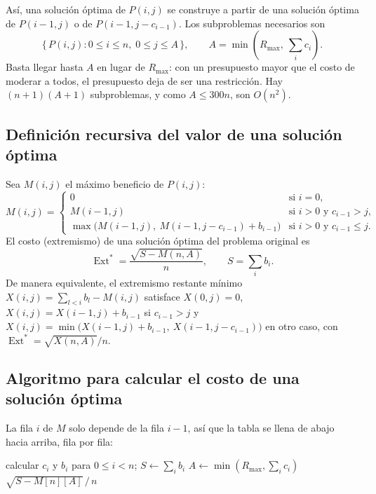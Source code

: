 \documentclass[11pt,letterpaper]{article}
\newcommand{\Ext}{\operatorname{Ext}}
\newcommand{\Rmax}{R_{\max}}
\begin{document}
Así, una solución óptima de $P(i,j)$ se construye a partir de una solución
óptima de $P(i-1,j)$ o de $P(i-1,j-c_{i-1})$. Los subproblemas necesarios son
\[
  \{\, P(i,j) : 0 \le i \le n,\; 0 \le j \le A \,\},
  \qquad A = \min\!\left(\Rmax,\ \sum_i c_i\right).
\]
Basta llegar hasta $A$ en lugar de $\Rmax$: con un presupuesto mayor que el
costo de moderar a todos, el presupuesto deja de ser una restricción. Hay
$(n+1)(A+1)$ subproblemas, y como $A \le 300n$, son $O(n^2)$.

\subsection{Definición recursiva del valor de una solución óptima}

Sea $M(i,j)$ el máximo beneficio de $P(i,j)$:
\[
  M(i,j) =
  \begin{cases}
    0 & \text{si } i = 0,\\[2pt]
    M(i-1, j) & \text{si } i > 0 \text{ y } c_{i-1} > j,\\[2pt]
    \max\bigl( M(i-1,j),\ M(i-1, j - c_{i-1}) + b_{i-1} \bigr) & \text{si } i > 0 \text{ y } c_{i-1} \le j.
  \end{cases}
\]
El costo (extremismo) de una solución óptima del problema original es
\[
  \Ext^* = \frac{\sqrt{S - M(n, A)}}{n}, \qquad S = \sum_i b_i .
\]
De manera equivalente, el extremismo restante mínimo
$X(i,j) = \sum_{l<i} b_l - M(i,j)$ satisface $X(0,j) = 0$,
$X(i,j) = X(i-1,j) + b_{i-1}$ si $c_{i-1} > j$ y
$X(i,j) = \min\bigl(X(i-1,j) + b_{i-1},\ X(i-1,j-c_{i-1})\bigr)$ en otro caso,
con $\Ext^* = \sqrt{X(n,A)}/n$.

\subsection{Algoritmo para calcular el costo de una solución óptima}

La fila $i$ de $M$ solo depende de la fila $i-1$, así que la tabla se llena
de abajo hacia arriba, fila por fila:

\begin{algorithm}[h]
\caption{Costo óptimo por programación dinámica}
\label{alg:pd-costo}
\KwOut{$\Ext^*$}
calcular $c_i$ y $b_i$ para $0 \le i < n$; $S \gets \sum_i b_i$\;
$A \gets \min(\Rmax, \sum_i c_i)$\;
\Return $\sqrt{S - M[n][A]}\,/\,n$\;
\end{algorithm}
\end{document}
